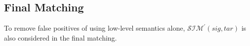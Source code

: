 

\subsection{Final Matching} \label{subsec:matching:final}

To remove false positives of using low-level semantics alone, $\mathcal{SIM^\prime}(sig, tar)$ is also considered in the final matching.

